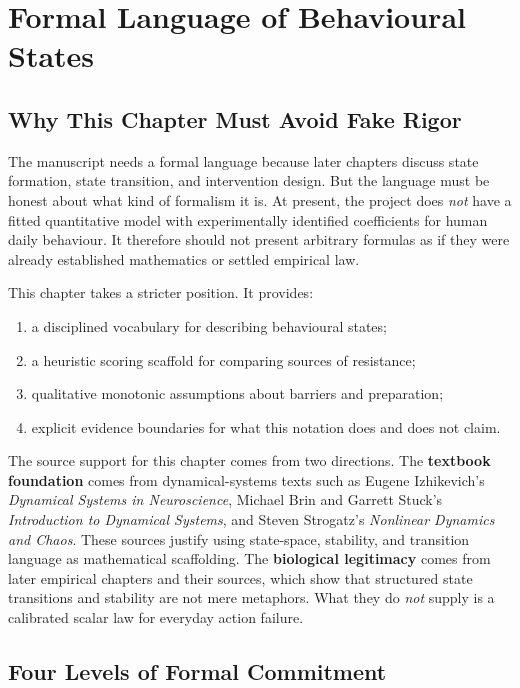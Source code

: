 \chapter{Formal Language of Behavioural States}
\label{ch:formal-language}

\section{Why This Chapter Must Avoid Fake Rigor}

The manuscript needs a formal language because later chapters discuss state
formation, state transition, and intervention design. But the language must be
honest about what kind of formalism it is. At present, the project does
\emph{not} have a fitted quantitative model with experimentally identified
coefficients for human daily behaviour. It therefore should not present
arbitrary formulas as if they were already established mathematics or settled
empirical law.

This chapter takes a stricter position. It provides:
\begin{enumerate}[nosep]
  \item a disciplined vocabulary for describing behavioural states;
  \item a heuristic scoring scaffold for comparing sources of resistance;
  \item qualitative monotonic assumptions about barriers and preparation;
  \item explicit evidence boundaries for what this notation does and does not
        claim.
\end{enumerate}

\begin{discussion}
The source support for this chapter comes from two directions. The
\textbf{textbook foundation} comes from dynamical-systems texts such as Eugene
Izhikevich's \emph{Dynamical Systems in Neuroscience}, Michael Brin and Garrett
Stuck's \emph{Introduction to Dynamical Systems}, and Steven Strogatz's
\emph{Nonlinear Dynamics and Chaos}. These sources justify using state-space,
stability, and transition language as mathematical scaffolding. The
\textbf{biological legitimacy} comes from later empirical chapters and their
sources, which show that structured state transitions and stability are not
mere metaphors. What they do \emph{not} supply is a calibrated scalar law for
everyday action failure.
\end{discussion}

\section{Four Levels of Formal Commitment}

